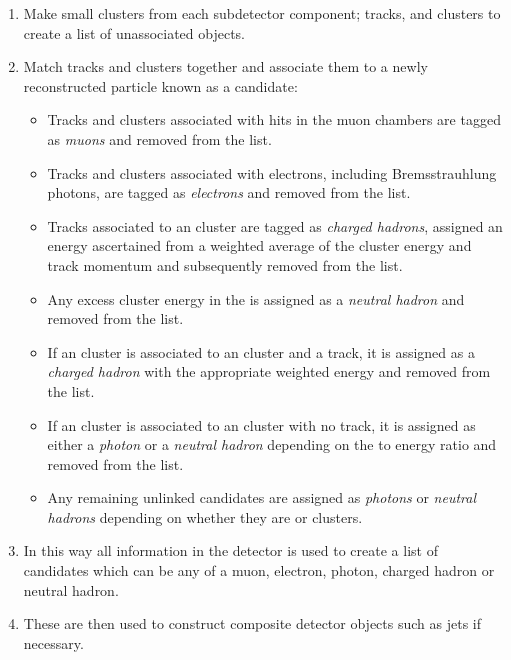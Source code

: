 \begin{enumerate}
  \item{Make small clusters from each subdetector component; tracks, \ECAL and \HCAL clusters to create a list of unassociated objects.}
  \item{Match tracks and clusters together and associate them to a newly reconstructed particle known as a \PF candidate:}
  \begin{itemize}
    \item{Tracks and clusters associated with hits in the muon chambers are tagged as \emph{muons} and removed from the list.}
    \item{Tracks and clusters associated with electrons, including Bremsstrauhlung photons, are tagged as \emph{electrons} and removed from the list.}
    \item{Tracks associated to an \HCAL cluster are tagged as \emph{charged hadrons}, assigned an energy ascertained from a weighted average of the cluster energy and track momentum and subsequently removed from the list.}
    \item{Any excess cluster energy in the \HCAL is assigned as a \emph{neutral hadron} and removed from the list.}
    \item{If an \ECAL cluster is associated to an \HCAL cluster and a track, it is assigned as a \emph{charged hadron} with the appropriate weighted energy and removed from the list.}
    \item{If an \ECAL cluster is associated to an \HCAL cluster with no track, it is assigned as either a \emph{photon} or a \emph{neutral hadron} depending on the \HCAL to \ECAL energy ratio and removed from the list.}
    \item{Any remaining unlinked candidates are assigned as \emph{photons} or \emph{neutral hadrons} depending on whether they are \ECAL or \HCAL clusters.}
  \end{itemize}
  \item{In this way all information in the detector is used to create a list of candidates which can be any of a muon, electron, photon, charged hadron or neutral hadron.}
  \item{These are then used to construct composite detector objects such as jets if necessary.}
\end{enumerate}

